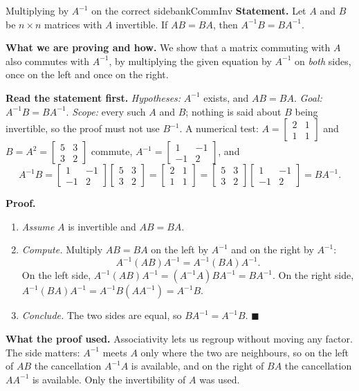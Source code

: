 \documentclass[11pt]{article}
\begin{document}
\begin{exmp}{Multiplying by $A^{-1}$ on the correct side}{bankCommInv}
\textbf{Statement.} Let $A$ and $B$ be $n\times n$ matrices with $A$ invertible. If $AB=BA$, then $A^{-1}B=BA^{-1}$.

\textbf{What we are proving and how.} We show that a matrix commuting with $A$ also commutes with $A^{-1}$, by multiplying the given equation by $A^{-1}$ on \emph{both} sides, once on the left and once on the right.

\textbf{Read the statement first.} \emph{Hypotheses:} $A^{-1}$ exists, and $AB=BA$. \emph{Goal:} $A^{-1}B=BA^{-1}$. \emph{Scope:} every such $A$ and $B$; nothing is said about $B$ being invertible, so the proof must not use $B^{-1}$. A numerical test: $A=\begin{bmatrix}2&1\\1&1\end{bmatrix}$ and $B=A^2=\begin{bmatrix}5&3\\3&2\end{bmatrix}$ commute, $A^{-1}=\begin{bmatrix}1&-1\\-1&2\end{bmatrix}$, and
\[
A^{-1}B=\begin{bmatrix}1&-1\\-1&2\end{bmatrix}\begin{bmatrix}5&3\\3&2\end{bmatrix}=\begin{bmatrix}2&1\\1&1\end{bmatrix}=\begin{bmatrix}5&3\\3&2\end{bmatrix}\begin{bmatrix}1&-1\\-1&2\end{bmatrix}=BA^{-1}.
\]

\textbf{Proof.}
\begin{enumerate}[itemsep=2pt]
  \item \emph{Assume} $A$ is invertible and $AB=BA$.
  \item \emph{Compute.} Multiply $AB=BA$ on the left by $A^{-1}$ and on the right by $A^{-1}$:
  \[
  A^{-1}(AB)A^{-1}=A^{-1}(BA)A^{-1}.
  \]
  On the left side, $A^{-1}(AB)A^{-1}=(A^{-1}A)BA^{-1}=BA^{-1}$. On the right side, $A^{-1}(BA)A^{-1}=A^{-1}B(AA^{-1})=A^{-1}B$.
  \item \emph{Conclude.} The two sides are equal, so $BA^{-1}=A^{-1}B$. \qquad$\blacksquare$
\end{enumerate}

\textbf{What the proof used.} Associativity lets us regroup without moving any factor. The side matters: $A^{-1}$ meets $A$ only where the two are neighbours, so on the left of $AB$ the cancellation $A^{-1}A$ is available, and on the right of $BA$ the cancellation $AA^{-1}$ is available. Only the invertibility of $A$ was used.
\end{exmp}
\end{document}
